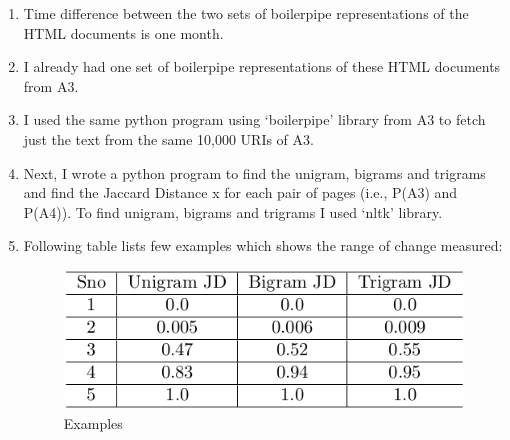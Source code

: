 \begin{enumerate}

\item Time difference between the two sets of boilerpipe representations of the HTML documents is one month.

\item I already had one set of boilerpipe representations of these HTML documents from A3.

\item I used the same python program using `boilerpipe' library from A3 to fetch just the text from the same 10,000 URIs of A3.

\item Next, I wrote a python program to find the unigram, bigrams and trigrams and find the Jaccard Distance x for each pair of pages (i.e., P(A3) and P(A4)). To find unigram, bigrams and trigrams
I used `nltk' library.

\item Following table lists few examples which shows the range of change measured:

\begin{figure}[ht]    
    \begin{center}
        \includegraphics[scale=0.60]{src/examples.png}
        \caption{Examples}        
    \end{center}
\end{figure}



\end{enumerate}

